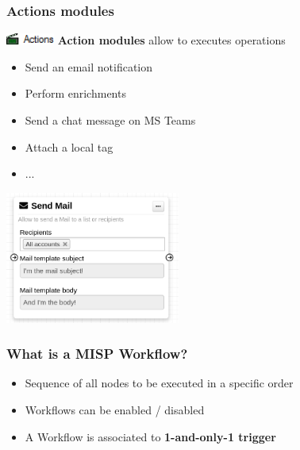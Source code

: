 \begin{frame}
    \frametitle{Actions modules}
    \vspace*{0.25em}
    \includegraphics[width=60px]{pictures/sc-action.png}
    \vspace*{0.25em}
    {\Large {}} \textbf{Action modules} allow to executes operations
    \begin{itemize}
        \item Send an email notification
        \item Perform enrichments
        \item Send a chat message on MS Teams
        \item Attach a local tag
        \item ...
    \end{itemize}

    \vspace*{0.5em}
    \begin{center}
        \includegraphics[width=0.43\textwidth]{pictures/action-module.png}
    \end{center}
\end{frame}

\begin{frame}
    \frametitle{What is a MISP Workflow?}
    \begin{itemize}
        \item Sequence of all nodes to be executed in a specific order
        \item Workflows can be enabled / disabled
        \item A Workflow is associated to \textbf{1-and-only-1 trigger}
    \end{itemize}
    \vspace*{0.5em}
    \begin{center}
    \end{center}
\end{frame}


